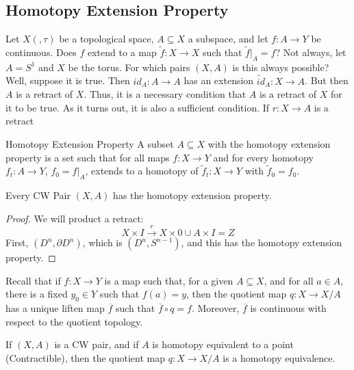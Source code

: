     \subsection{Homotopy Extension Property}
        Let $X(,\tau)$ be a topological space,
        $A\subseteq{X}$ a subspace, and let
        $f:A\rightarrow{Y}$ be continuous. Does
        $f$ extend to a map $\tilde{f}:X\rightarrow{X}$
        such that $\tilde{f}|_{A}=f$? Not always, let
        $A=S^{1}$ and $X$ be the torus. For which pairs
        $(X,A)$ is this always possible? Well, suppose
        it is true. Then $id_{A}:A\rightarrow{A}$ has
        an extension $\tilde{id}_{A}:X\rightarrow{A}$.
        But then $A$ is a retract of $X$. Thus, it
        is a necessary condition that $A$ is a retract
        of $X$ for it to be true. As it turns out, it is
        also a sufficient condition. If
        $r:X\rightarrow{A}$ is a retract
        \begin{ldefinition}{Homotopy Extension Property}
            A subset $A\subseteq{X}$ with the homotopy
            extension property is a set such that for all
            maps $f:X\rightarrow{Y}$ and for every
            homotopy $f_{t}:A\rightarrow{Y}$,
            $f_{0}=f|_{A}$, extends to a homotopy of
            $\tilde{f}_{t}:X\rightarrow{Y}$ with
            $\tilde{f}_{0}=f_{0}$.
        \end{ldefinition}
        \begin{theorem}
            Every CW Pair $(X,A)$ has the homotopy
            extension property.
        \end{theorem}
        \begin{proof}
            We will product a retract:
            \begin{equation}
                X\times{I}\overset{r}{\longrightarrow}
                    X\times{0}\cup{A}\times{I}=Z
            \end{equation}
            First, $(D^{n},\partial{D}^{n})$, which is
            $(D^{n},S^{n-1})$, and this has the
            homotopy extension property.
        \end{proof}
        Recall that if $f:X\rightarrow{Y}$ is a map such that,
        for a given $A\subseteq{X}$, and for all $a\in{A}$,
        there is a fixed $y_{0}\in{Y}$ such that $f(a)=y$, then
        the quotient map $q:X\rightarrow{X/A}$ has a unique
        liften map $\overline{f}$ such that
        $\overline{f}\circ{q}=f$. Moreover, $\overline{f}$ is
        continuous with respect to the quotient topology.
        \begin{theorem}
            If $(X,A)$ is a CW pair, and if $A$ is
            homotopy equivalent to a point
            (Contractible), then the quotient map
            $q:X\rightarrow{X/A}$ is a homotopy
            equivalence.
        \end{theorem}

